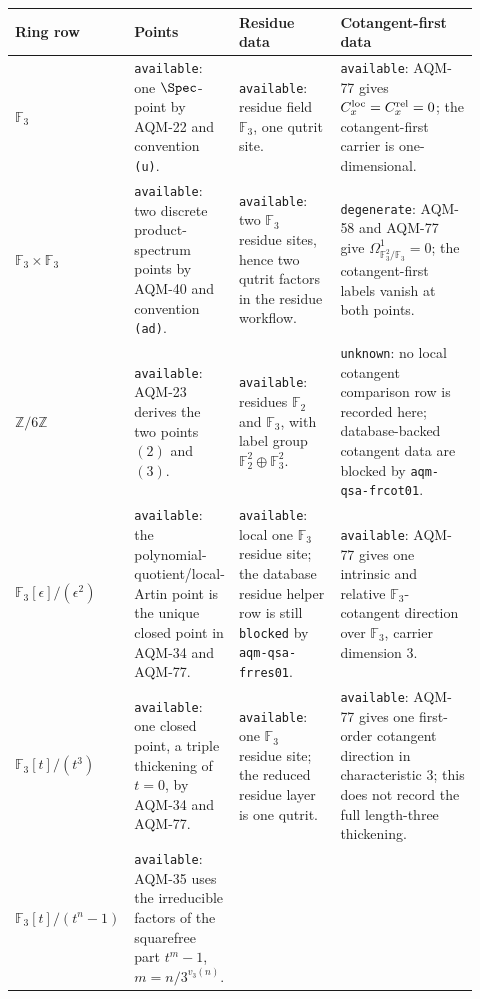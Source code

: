 \begin{center}
\scriptsize\setlength{\tabcolsep}{3pt}
\begin{tabular}{p{0.20\linewidth}p{0.20\linewidth}p{0.22\linewidth}p{0.30\linewidth}}
\toprule
Ring row & Points & Residue data & Cotangent-first data \\
\midrule
\(\mathbb F_3\) &
\texttt{available}: one \(\Spec\)-point by AQM-22 and convention
\texttt{(u)}. &
\texttt{available}: residue field \(\mathbb F_3\), one qutrit site. &
\texttt{available}: AQM-77 gives
\(C_x^{\rm loc}=C_x^{\rm rel}=0\); the cotangent-first carrier is
one-dimensional. \\
\addlinespace
\(\mathbb F_3\times\mathbb F_3\) &
\texttt{available}: two discrete product-spectrum points by AQM-40 and
convention \texttt{(ad)}. &
\texttt{available}: two \(\mathbb F_3\) residue sites, hence two qutrit
factors in the residue workflow. &
\texttt{degenerate}: AQM-58 and AQM-77 give
\(\Omega^1_{\mathbb F_3^2/\mathbb F_3}=0\); the cotangent-first labels vanish
at both points. \\
\addlinespace
\(\mathbb Z/6\mathbb Z\) &
\texttt{available}: AQM-23 derives the two points \((2)\) and \((3)\). &
\texttt{available}: residues \(\mathbb F_2\) and \(\mathbb F_3\), with label
group \(\mathbb F_2^2\oplus\mathbb F_3^2\). &
\texttt{unknown}: no local cotangent comparison row is recorded here;
database-backed cotangent data are blocked by \texttt{aqm-qsa-frcot01}. \\
\addlinespace
\(\mathbb F_3[\epsilon]/(\epsilon^2)\) &
\texttt{available}: the polynomial-quotient/local-Artin point is the unique
closed point in AQM-34 and AQM-77. &
\texttt{available}: local one \(\mathbb F_3\) residue site; the database
residue helper row is still \texttt{blocked} by \texttt{aqm-qsa-frres01}. &
\texttt{available}: AQM-77 gives one intrinsic and relative
\(\mathbb F_3\)-cotangent direction over \(\mathbb F_3\), carrier dimension
\(3\). \\
\addlinespace
\(\mathbb F_3[t]/(t^3)\) &
\texttt{available}: one closed point, a triple thickening of \(t=0\), by
AQM-34 and AQM-77. &
\texttt{available}: one \(\mathbb F_3\) residue site; the reduced residue
layer is one qutrit. &
\texttt{available}: AQM-77 gives one first-order cotangent direction in
characteristic \(3\); this does not record the full length-three thickening. \\
\addlinespace
\(\mathbb F_3[t]/(t^n-1)\) &
\texttt{available}: AQM-35 uses the irreducible factors of the squarefree
part \(t^m-1\), \(m=n/3^{v_3(n)}\). &

\end{tabular}
\end{center}
